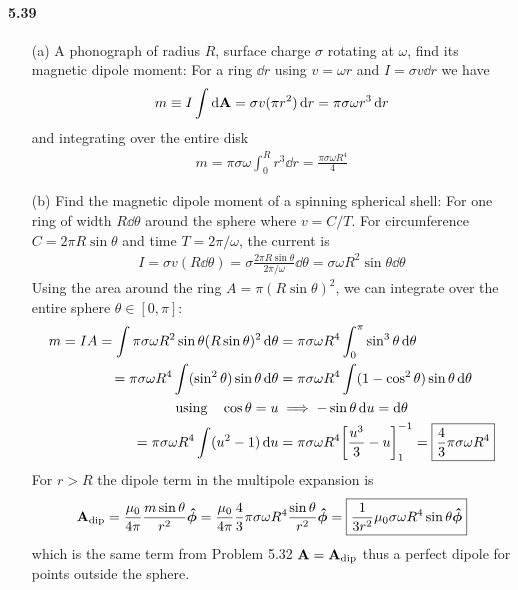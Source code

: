 \documentclass[../main.tex]{subfiles}
\begin{document}
\paragraph{5.39}
\begin{itemize}
    \item [(a)] A phonograph of radius $R$, surface charge $\sigma$ rotating at $\omega$, find its magnetic dipole moment:
    For a ring $\dd{r}$ using $v = \omega r$ and $I = \sigma v \dd{r}$ we have
    \begin{align*}
        m \equiv I \int \dd{\vb A}  = \sigma v (\pi r^2) \dd{r} = \pi \sigma \omega r^3 \dd{r}
    \end{align*}
    and integrating over the entire disk
    \begin{align*}
        m = \pi \sigma \omega \int_0^R r^3 \dd{r} = \frac{\pi \sigma \omega R^4}{4}
    \end{align*}
    \item [(b)] Find the magnetic dipole moment of a spinning spherical shell:
    For one ring of width $R \dd{\theta}$ around the sphere where $v = C / T$. For circumference $C = 2\pi R \sin\theta$ and time $T = 2\pi / \omega$,
    the current is
    \begin{align*}
        I = \sigma v (R \dd{\theta}) = \sigma \frac{2\pi R \sin\theta}{2\pi / \omega} \dd{\theta} = \sigma \omega R^2 \sin\theta \dd{\theta}
    \end{align*}
    Using the area around the ring $A = \pi (R\sin\theta)^2$, we can integrate over the entire sphere $\theta \in [0, \pi]$:
    \begin{align*}
        m = I A = \int \pi \sigma \omega R^2 \sin\theta (R\sin\theta)^2 \dd{\theta} &= \pi \sigma \omega R^4 \int_0^\pi \sin^3\theta \dd{\theta} \\
        = \pi \sigma \omega R^4 \int (\sin^2\theta) \sin\theta \dd{\theta} &= \pi \sigma \omega R^4 \int (1 - \cos^2\theta) \sin\theta \dd{\theta} \\
        \qusing \cos\theta = u &\implies -\sin\theta \dd{u} = \dd{\theta} \\
        = \pi\sigma \omega  R^4 \int (u^2 - 1) \dd{u} &= \pi\sigma \omega R^4 \qt[
            \frac{u^3}{3} - u
        ]_1^{-1} = \boxed{\frac{4}{3} \pi \sigma \omega  R^4}
    \end{align*}
    For $r > R$ the dipole term in the multipole expansion is
    \begin{align*}
        \vb A_\text{dip} = \frac{\mu_0}{4\pi} \frac{m \sin\theta}{r^2} \vu*\phi = \frac{\mu_0}{4\pi} \frac{4}{3} \pi \sigma \omega R^4 \frac{\sin\theta}{r^2} \vu*\phi = \boxed{\frac{1}{3r^2} \mu_0 \sigma \omega R^4 \sin\theta \vu*\phi}
    \end{align*}
    which is the same term from Problem 5.32 $\vb A = \vb A_\text{dip}$ thus a perfect dipole for points outside the sphere.
\end{itemize}
\end{document}
